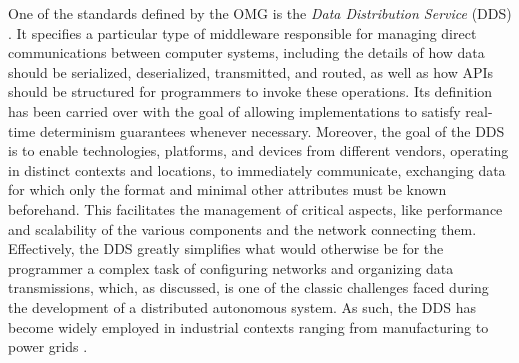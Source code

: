 One of the standards defined by the OMG is the \emph{Data Distribution Service} (DDS) \cite{pardo-castellote_omg_2003,schlesselman_omg_2004}. It specifies a particular type of middleware responsible for managing direct communications between computer systems, including the details of how data should be serialized, deserialized, transmitted, and routed, as well as how APIs should be structured for programmers to invoke these operations. Its definition has been carried over with the goal of allowing implementations to satisfy real-time determinism guarantees whenever necessary. Moreover, the goal of the DDS is to enable technologies, platforms, and devices from different vendors, operating in distinct contexts and locations, to immediately communicate, exchanging data for which only the format and minimal other attributes must be known beforehand. This facilitates the management of critical aspects, like performance and scalability of the various components and the network connecting them. Effectively, the DDS greatly simplifies what would otherwise be for the programmer a complex task of configuring networks and organizing data transmissions, which, as discussed, is one of the classic challenges faced during the development of a distributed autonomous system. As such, the DDS has become widely employed in industrial contexts ranging from manufacturing \cite{essers_evaluating_2014} to power grids \cite{saxena_distributed_2021}.

